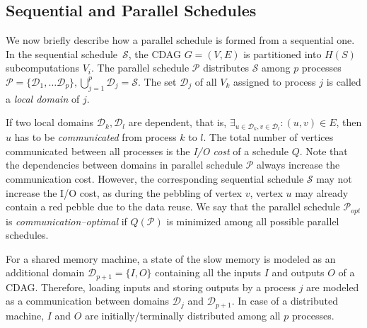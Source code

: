 \documentclass[sigplan,review,anonymous,10pt]{acmart}\settopmatter{printfolios=true,printccs=false,printacmref=false}
\newcommand\mac[1]{\textcolor{red}{[Mac: #1]}}
\begin{document}


\subsection{Sequential and Parallel Schedules}
\label{sec:seqpar}

We now briefly describe how a parallel schedule is formed from a sequential 
one. In the sequential
schedule~$\mathcal{S}$, the CDAG $G = (V,E)$ is partitioned into $H(S)$
subcomputations $V_i$. The parallel schedule $\mathcal{P}$ distributes
$\mathcal{S}$ among $p$ processes $\mathcal{P} = \{\mathcal{D}_1, \dots
\mathcal{D}_p\}, \bigcup_{j=1}^p \mathcal{D}_j = \mathcal{S}$. The set
$\mathcal{D}_j$ of all $V_k$ assigned to process $j$ is called a \emph{local
domain} of $j$.

If two local domains $\mathcal{D}_k, \mathcal{D}_l$ are dependent, that is,
\linebreak $\exists_{u \in \mathcal{D}_k, v \in \mathcal{D}_l} : (u,v) \in E$,
then $u$ has to be \emph{communicated} from process $k$ to $l$. The total
number of vertices communicated between all processes is the \emph{I/O cost} of
a schedule $Q$.  Note that the dependencies between domains in parallel
schedule $\mathcal{P}$ always increase the communication cost. However, the
corresponding sequential schedule $\mathcal{S}$ may not increase the I/O cost,
as during the pebbling of vertex $v$, vertex $u$ may already contain a red
pebble due to the data reuse.  We say that the parallel schedule
$\mathcal{P}_{opt}$ is
\emph{communication--optimal} if $Q(\mathcal{P})$ is minimized among all
possible parallel schedules. 

For a shared memory machine, a state of the slow memory is modeled as an
additional domain $\mathcal{D}_{p+1} = \{ I, O \}$ containing all the inputs
$I$ and outputs $O$ of a CDAG. Therefore, loading inputs and storing outputs by
a process $j$ are modeled as a communication between domains $\mathcal{D}_j$
and $\mathcal{D}_{p+1}$. In case of a distributed machine, $I$ and $O$ are
initially/terminally distributed among all $p$ processes.
\end{document}
